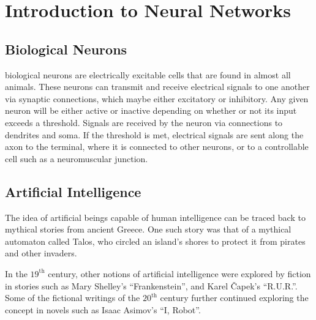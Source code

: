 \chapter{Introduction to Neural Networks}


\section{Biological Neurons}

biological neurons are electrically excitable cells that are found in almost all
animals.
These neurons can transmit and receive electrical signals to one another via
synaptic connections, which maybe either excitatory or inhibitory.
Any given neuron will be either active or inactive depending on whether or not
its input exceeds a threshold.
Signals are received by the neuron via connections to dendrites and soma.
If the threshold is met, electrical signals are sent along the axon to the
terminal, where it is connected to other neurons, or to a controllable cell such
as a neuromuscular junction.




\section{Artificial Intelligence}

The idea of artificial beings capable of human intelligence can be traced back
to mythical stories from ancient Greece.
One such story was that of a mythical automaton called Talos, who circled an
island's shores to protect it from pirates and other invaders.

In the $19^\text{th}$ century, other notions of artificial intelligence were
explored by fiction in stories such as Mary Shelley's ``Frankenstein'', and
Karel \v{C}apek's ``R.U.R.''.
Some of the fictional writings of the $20^\text{th}$ century further continued
exploring the concept in novels such as Isaac Asimov's ``I, Robot''.




